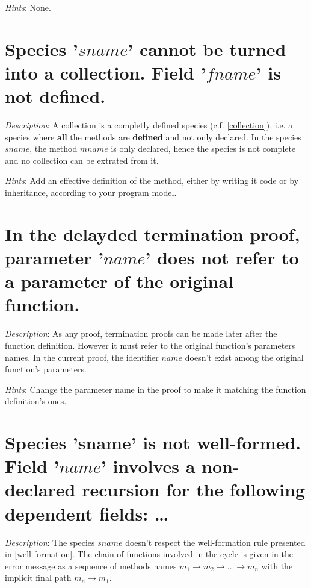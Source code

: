 {\em Hints}: None.



\section*{Species '$sname$' cannot be turned into a collection. Field
  '$fname$' is not defined.}

{\em Description}: A collection is a completly defined species
(c.f. \ref{collection}), i.e. a species where {\bf all} the methods
are {\bf defined} and not only declared. In the species $sname$, the
method $mname$ is only declared, hence the species is not complete and
no collection can be extrated from it.

{\em Hints}: Add an effective definition of the method, either by
writing it code or by inheritance, according to your program model.



\section*{In the delayded termination proof, parameter '$name$' does
  not refer to a parameter of the original function.}

{\em Description}: As any proof, termination proofs can be made later
after the function definition. However it must refer to the original
function's parameters names. In the current proof, the identifier
$name$ doesn't exist among the original function's parameters.

{\em Hints}: Change the parameter name in the proof to make it
matching the function definition's ones.



\section*{Species 'sname' is not well-formed. Field '$name$' involves
  a non-declared recursion for the following dependent fields: \ldots}

{\em Description}: The species $sname$ doesn't respect the
well-formation rule presented in \ref{well-formation}. The chain of
functions involved in the cycle is given in the error message as a
sequence of methods names
$m_1 \rightarrow m_2 \rightarrow \ldots \rightarrow m_n$ with the
implicit final path $m_n \rightarrow m_1$.

